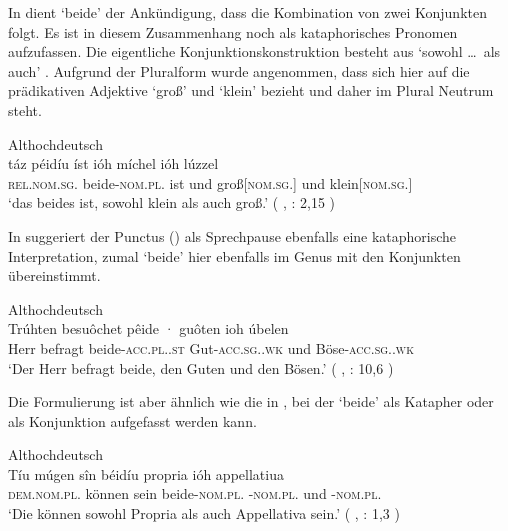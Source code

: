 
In  dient  `beide' der Ankündigung, dass die
Kombination von zwei Konjunkten folgt. Es ist in diesem Zusammenhang noch als
kataphorisches Pronomen aufzufassen. Die eigentliche Konjunktionskonstruktion
besteht aus  `sowohl \dots\ als auch'
\autocite[vgl.][169]{schuetzeichel2012}. Aufgrund der Pluralform wurde
angenommen, dass  sich hier auf die prädikativen
Adjektive  `groß' und  `klein'
bezieht und daher im Plural Neutrum steht.

\begin{exe}
\ex \label{ex:beidejohahd_1}
	\langinfo%
		{Althochdeutsch}%
		{}%
		{\cite[nach][57]{king1972}}\\
\gll táz péidíu íst ióh míchel ióh lúzzel \\
	\textsc{rel.nom.sg.\NeutI} beide-\textsc{nom.pl.\NeutI} ist und
	groß[\textsc{nom.sg.\NeutI}] und klein[\textsc{nom.sg.\NeutI}] \\
\trans `das beides ist, sowohl klein als auch groß.'
	(%
		, : 2,15%
	)
\end{exe}

In  suggeriert der Punctus () als Sprechpause
ebenfalls eine kataphorische Interpretation, zumal  `beide' hier
ebenfalls im Genus mit den Konjunkten übereinstimmt.

\begin{exe}
\ex \label{ex:beidejohahd_2}
	\langinfo%
		{Althochdeutsch}%
		{}%
		{\cite[nach][35]{tax1979}}\\
	\gll Trúhten besuôchet pêide · guôten ioh úbelen \\
		Herr befragt beide-\textsc{acc.pl.\MascA.st} {}
			Gut-\textsc{acc.sg.\MascA.wk} und
			Böse-\textsc{acc.sg.\MascA.wk} \\
	\trans `Der Herr befragt beide, den Guten und den Bösen.'
		(%
			, : 10,6%
		)
\end{exe}

Die Formulierung ist aber ähnlich wie die in , bei der
 `beide' als Katapher oder als Konjunktion aufgefasst
werden kann.

\begin{exe}
\ex \label{ex:beidejohahd_3}
	\langinfo%
		{Althochdeutsch}%
		{}%
		{\cite[nach][6]{king1972}}\\
	\gll Tíu múgen sîn béidíu propria ióh appellatiua \\
		\textsc{dem.nom.pl.\NeutI} können sein beide-\textsc{nom.pl.\NeutI}
			-\textsc{nom.pl.\NeutI} und
			-\textsc{nom.pl.\NeutI} \\
	\trans `Die können sowohl Propria als auch Appellativa sein.'
		(%
			, : 1,3%
		)
\end{exe}

